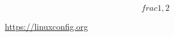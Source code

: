 \documentclass{article}
\begin{document}
$$ frac{1, 2} $$

\url{https://linuxconfig.org}
\end{document}
